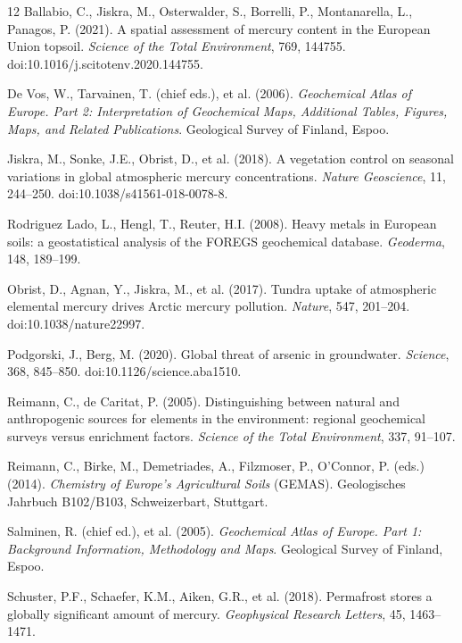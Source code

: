 \documentclass[11pt]{article}
\begin{document}
\begin{thebibliography}{12}
Ballabio, C., Jiskra, M., Osterwalder, S., Borrelli, P., Montanarella, L.,
Panagos, P. (2021). A spatial assessment of mercury content in the European
Union topsoil. \emph{Science of the Total Environment}, 769, 144755.
doi:10.1016/j.scitotenv.2020.144755.

De Vos, W., Tarvainen, T. (chief eds.), et al. (2006). \emph{Geochemical
Atlas of Europe. Part 2: Interpretation of Geochemical Maps, Additional
Tables, Figures, Maps, and Related Publications}. Geological Survey of
Finland, Espoo.

Jiskra, M., Sonke, J.E., Obrist, D., et al. (2018). A vegetation control on
seasonal variations in global atmospheric mercury concentrations.
\emph{Nature Geoscience}, 11, 244--250. doi:10.1038/s41561-018-0078-8.

Rodriguez Lado, L., Hengl, T., Reuter, H.I. (2008). Heavy metals in European
soils: a geostatistical analysis of the FOREGS geochemical database.
\emph{Geoderma}, 148, 189--199.

Obrist, D., Agnan, Y., Jiskra, M., et al. (2017). Tundra uptake of
atmospheric elemental mercury drives Arctic mercury pollution.
\emph{Nature}, 547, 201--204. doi:10.1038/nature22997.

Podgorski, J., Berg, M. (2020). Global threat of arsenic in groundwater.
\emph{Science}, 368, 845--850. doi:10.1126/science.aba1510.

Reimann, C., de Caritat, P. (2005). Distinguishing between natural and
anthropogenic sources for elements in the environment: regional geochemical
surveys versus enrichment factors. \emph{Science of the Total Environment},
337, 91--107.

Reimann, C., Birke, M., Demetriades, A., Filzmoser, P., O'Connor, P. (eds.)
(2014). \emph{Chemistry of Europe's Agricultural Soils} (GEMAS).
Geologisches Jahrbuch B102/B103, Schweizerbart, Stuttgart.

Salminen, R. (chief ed.), et al. (2005). \emph{Geochemical Atlas of Europe.
Part 1: Background Information, Methodology and Maps}. Geological Survey of
Finland, Espoo.

Schuster, P.F., Schaefer, K.M., Aiken, G.R., et al. (2018). Permafrost stores
a globally significant amount of mercury. \emph{Geophysical Research
Letters}, 45, 1463--1471.


\end{thebibliography}
\end{document}
